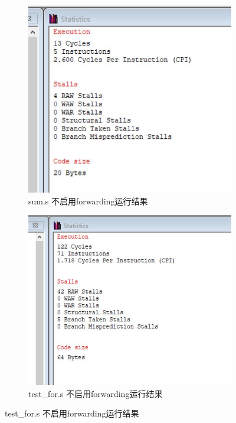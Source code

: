 \documentclass{ctexrep}
\begin{document}
\begin{figure}[htp]
    \centering
    \begin{subfigure}{.4\linewidth}
        \centering
        \includegraphics[width=\linewidth]{sum.s_without_forwarding.jpeg}
        \caption{sum.s 不启用forwarding运行结果}
    \end{subfigure}
    \begin{subfigure}{.4\linewidth}
        \centering
        \includegraphics[width=\linewidth]{test_for.s_without_forwarding.jpeg}
        \caption{test_for.s 不启用forwarding运行结果}
    \end{subfigure}


\end{figure}
\end{document}
